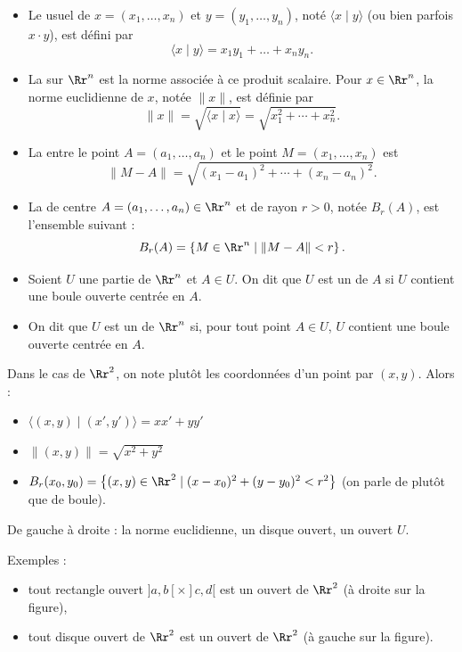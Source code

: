 \documentclass[11pt, class=report,crop=false]{standalone}
\begin{document}
\begin{itemize}
  \item Le  usuel de $x=(x_1,\ldots ,x_n)$ et $y=(y_1,\ldots ,y_n)$, noté $\langle x \mid y\rangle$ (ou bien parfois $x \cdot y$), est défini par
$$\langle x \mid y\rangle = x_1y_1+\dots +x_ny_n.$$

  \item La  sur $\Rr^n$ est la norme associée à ce produit scalaire. Pour $x\in \Rr^n$, la norme euclidienne de $x$, notée $\| x\|$, est définie par
$$\| x \| = \sqrt{\langle x \mid x\rangle} = \sqrt{x_1^2+\cdots +x_n^2}.$$

  \item La  entre le point $A = (a_1,\ldots ,a_n)$ et le point $M=(x_1,\dots ,x_n)$ est 
  $$\|M-A\|=\sqrt{(x_1-a_1)^2+\cdots +(x_n-a_n)^2}.$$
  
  \item La  de centre $A = (a_1,\ldots ,a_n) \in \Rr^n$ et de rayon $r>0$, notée $B_r(A)$, est l'ensemble suivant :
$$B_r(A)=\left\{M\in \Rr^n \mid \|M-A\|<r \right\}.$$


  \item Soient $U$ une partie de $\Rr^n$ et $A\in U$.
On dit que $U$ est un  de $A$ si $U$ contient une boule ouverte centrée en $A$.

  \item On dit que $U$ est un  de $\Rr^n$ si, pour tout point $A \in U$, $U$ contient une boule ouverte centrée en $A$.
\end{itemize}

Dans le cas de $\Rr^2$, on note plutôt les coordonnées d'un point par $(x,y)$. Alors :
\begin{itemize}
  \item $\langle (x,y) \mid (x',y') \rangle = xx'+yy'$
  \item $\| (x,y) \| = \sqrt{x^2+y^2}$
  \item $B_r(x_0,y_0) = \left\{ (x,y) \in \Rr^2 \mid (x-x_0)^2+(y-y_0)^2 <r^2 \right\}$ (on parle de  plutôt que de boule).
\end{itemize}

De gauche à droite : la norme euclidienne, un disque ouvert, un ouvert $U$.


Exemples : 
\begin{itemize}
  \item tout rectangle ouvert $]a,b[\times ]c,d[$ est un ouvert de $\Rr^2$ (à droite sur la figure),
  \item tout disque ouvert  de $\Rr^2$ est un ouvert de $\Rr^2$ (à gauche sur la figure).
\end{itemize}
\end{document}
